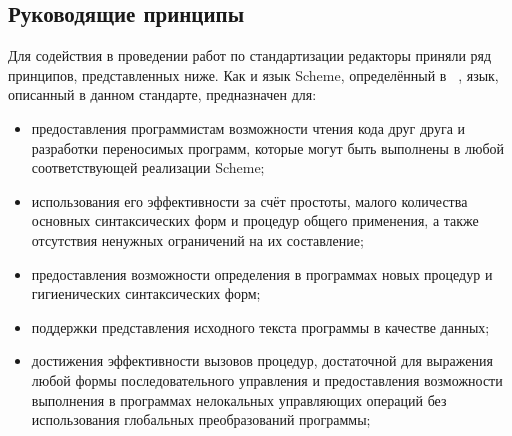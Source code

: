 \subsection*{Руководящие принципы}

Для содействия в проведении работ по стандартизации редакторы приняли ряд принципов, представленных
ниже. Как и язык Scheme, определённый в ~\cite{R5RS}, язык, описанный в данном стандарте,
предназначен для:\vspace{-1mm}

\begin{itemize}
\item предоставления программистам возможности чтения кода друг друга и разработки
  переносимых программ, которые могут быть выполнены в любой соответствующей реализации Scheme;

\item использования его эффективности за счёт простоты, малого количества основных
  синтаксических форм и процедур общего применения, а также отсутствия ненужных ограничений на их
  составление;

\item предоставления возможности определения в программах новых процедур и гигиенических
синтаксических форм;

\item поддержки представления исходного текста программы в качестве данных;

\item достижения эффективности вызовов процедур, достаточной для выражения любой формы
  последовательного управления и предоставления возможности выполнения в программах нелокальных
  управляющих операций без использования глобальных преобразований программы;\vspace{-1.2mm}


\end{itemize}
